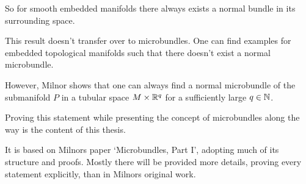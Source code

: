 \begin{myparagraph}
    So for smooth embedded manifolds there always exists a normal bundle
    in its surrounding space.

    This result doesn't transfer over to microbundles.
    One can find examples for embedded topological manifolds
    such that there doesn't exist a normal microbundle.

    However, Milnor shows that one can always find a normal microbundle
    of the submanifold $P$ in a tubular space $M \times \mathbb{R}^q$
    for a sufficiently large $q \in \mathbb{N}$.

    Proving this statement while presenting the concept of
    microbundles along the way is the content of this thesis.

    It is based on Milnors paper `Microbundles, Part I',
    adopting much of its structure and proofs.
    Mostly there will be provided more details, proving every statement explicitly, than in Milnors original work.
\end{myparagraph}